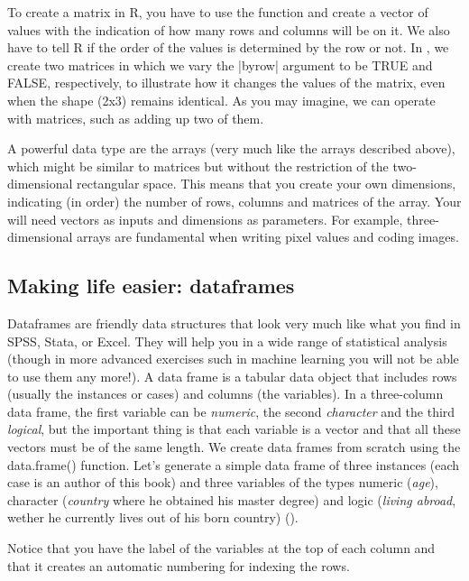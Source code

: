To create a matrix in R, you have to use the function  and
create a vector of values with the indication of how many rows and
columns will be on it. We also have to tell R if the order of the
values is determined by the row or not. In , we create
two matrices in which we vary the |byrow| argument to be TRUE and
FALSE, respectively, to illustrate how it changes the values of the
matrix, even when the shape (2x3) remains identical. As you may
imagine, we can operate with matrices, such as adding up two of them.

A powerful data type are the arrays (very much like the 
arrays described above), which might be similar to matrices but
without the restriction of the two-dimensional rectangular space. This
means that you create your own dimensions, indicating (in order) the
number of rows, columns and matrices of the array. Your will need
vectors as inputs and dimensions as parameters. For example,
three-dimensional arrays are fundamental when writing pixel values and
coding images. 


\subsection{Making life easier: dataframes}

Dataframes are friendly data structures that look very much like
what you find in SPSS, Stata, or Excel. They will help you in a wide
range of statistical analysis (though in more advanced exercises such
in machine learning you will not be able to use them any more!).  A
data frame is a tabular data object that includes rows (usually the
instances or cases) and columns (the variables). In a three-column data frame,
the first variable can be \emph{numeric}, the second \emph{character}
and the third \emph{logical}, but the important thing is that each
variable is a vector and that all these vectors must be of the same
length. We create data frames from scratch using the data.frame()
function.  Let’s generate a simple data frame of three instances (each
case is an author of this book) and three variables of the types
numeric (\emph{age}), character (\emph{country} where he obtained his
master degree) and logic (\emph{living abroad}, wether he currently
lives out of his born country) ().


Notice that you have the label of the variables at the top of each column and that it creates an automatic numbering for indexing the rows.  


